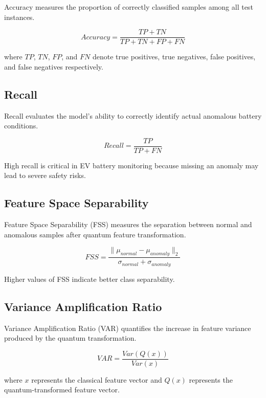 Accuracy measures the proportion of correctly classified samples among all test instances.

\begin{equation}
Accuracy = \frac{TP + TN}{TP + TN + FP + FN}
\end{equation}

where $TP$, $TN$, $FP$, and $FN$ denote true positives, true negatives, false positives, and false negatives respectively.

\subsection{Recall}

Recall evaluates the model's ability to correctly identify actual anomalous battery conditions.

\begin{equation}
Recall = \frac{TP}{TP + FN}
\end{equation}

High recall is critical in EV battery monitoring because missing an anomaly may lead to severe safety risks.

\subsection{Feature Space Separability}

Feature Space Separability (FSS) measures the separation between normal and anomalous samples after quantum feature transformation.

\begin{equation}
FSS = \frac{\|\mu_{normal} - \mu_{anomaly}\|_2}{\sigma_{normal} + \sigma_{anomaly}}
\end{equation}

Higher values of FSS indicate better class separability.

\subsection{Variance Amplification Ratio}

Variance Amplification Ratio (VAR) quantifies the increase in feature variance produced by the quantum transformation.

\begin{equation}
VAR = \frac{Var(Q(x))}{Var(x)}
\end{equation}

where $x$ represents the classical feature vector and $Q(x)$ represents the quantum-transformed feature vector.

